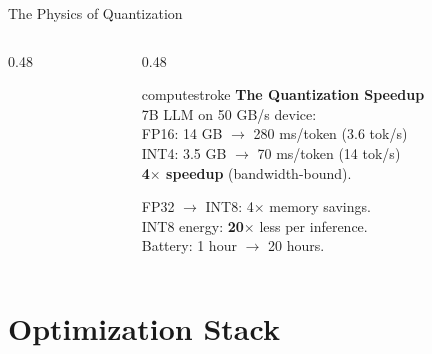 \documentclass[aspectratio=169, 12pt]{beamer}
\begin{document}
\begin{frame}{The Physics of Quantization}
\begin{columns}[T]
\begin{column}{0.48\textwidth}
    \vspace{0.1cm}
  \end{column}
  \begin{column}{0.48\textwidth}
    \begin{mlsyscard}{computestroke}
    {\scriptsize \textbf{The Quantization Speedup}\\[0.05cm]
    7B LLM on 50 GB/s device:\\
    FP16: 14 GB $\to$ 280 ms/token (3.6 tok/s)\\
    INT4: 3.5 GB $\to$ 70 ms/token (14 tok/s)\\[0.05cm]
    \textcolor{computestroke}{\textbf{4$\times$ speedup}} (bandwidth-bound).}
    \end{mlsyscard}

    \vspace{0.1cm}
    FP32 $\to$ INT8: 4$\times$ memory savings.\\
    INT8 energy: \textbf{20$\times$} less per inference.\\
    Battery: 1 hour $\to$ 20 hours.
  \end{column}
\end{columns}

\end{frame}

\section{Optimization Stack}
\end{document}
